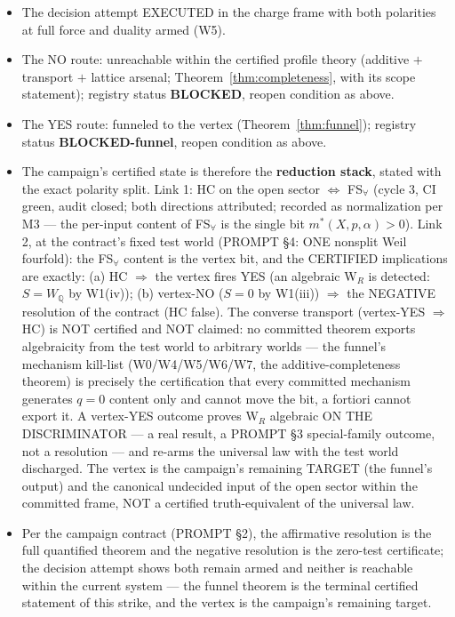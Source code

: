 \documentclass[11pt]{article}
\theoremstyle{definition}
\newcommand{\Q}{\mathbb{Q}}
\begin{document}
\begin{itemize}
\item The decision attempt EXECUTED in the charge frame with both polarities
at full force and duality armed (W5).
\item The NO route: unreachable within the certified profile theory
(additive $+$ transport $+$ lattice arsenal;
Theorem~\ref{thm:completeness}, with its scope statement); registry status
\textbf{BLOCKED}, reopen condition as above.
\item The YES route: funneled to the vertex (Theorem~\ref{thm:funnel}); registry
status \textbf{BLOCKED-funnel}, reopen condition as above.
\item The campaign's certified state is therefore the \textbf{reduction
stack}, stated with the exact polarity split. Link 1:
HC on the open sector $\iff$ FS$_\forall$ (cycle 3, CI green, audit
closed; both directions attributed; recorded as normalization per M3 ---
the per-input content of FS$_\forall$ is the single bit
$m^*(X,p,\alpha) > 0$). Link 2, at the contract's fixed test world
(PROMPT \S4: ONE nonsplit Weil fourfold): the FS$_\forall$ content is the
vertex bit, and the CERTIFIED implications are exactly:
(a) HC $\Rightarrow$ the vertex fires YES (an algebraic W$_R$ is
detected: $S = W_\Q$ by W1(iv));
(b) vertex-NO ($S = 0$ by W1(iii)) $\Rightarrow$ the NEGATIVE
resolution of the contract (HC false).
The converse transport (vertex-YES $\Rightarrow$ HC) is NOT certified
and NOT claimed: no committed theorem exports algebraicity from the
test world to arbitrary worlds --- the funnel's mechanism kill-list
(W0/W4/W5/W6/W7, the additive-completeness theorem) is precisely the
certification that every committed mechanism generates $q=0$ content
only and cannot move the bit, a fortiori cannot export it. A vertex-YES
outcome proves W$_R$ algebraic ON THE DISCRIMINATOR --- a real result,
a PROMPT \S3 special-family outcome, not a resolution --- and re-arms
the universal law with the test world discharged. The vertex is the
campaign's remaining TARGET (the funnel's output) and the canonical
undecided input of the open sector within the committed frame, NOT a
certified truth-equivalent of the universal law.
\item Per the campaign contract (PROMPT \S2), the affirmative resolution is
the full quantified theorem and the negative resolution is the zero-test
certificate; the decision attempt shows both remain armed and neither is
reachable within the current system --- the funnel theorem is the terminal
certified statement of this strike, and the vertex is the campaign's
remaining target.
\end{itemize}
\end{document}
